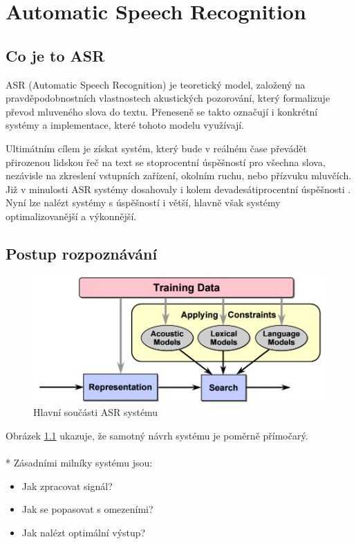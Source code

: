 \chapter{Automatic Speech Recognition}

\section{Co je to ASR}

ASR (Automatic Speech Recognition) je teoretický model, založený na pravděpodobnostních vlastnostech akustických pozorování, který formalizuje převod mluveného slova do textu. Přeneseně se takto označují i konkrétní systémy a implementace, které tohoto modelu využívají. 

Ultimátním cílem  je získat systém, který bude v reálném čase převádět přirozenou lidskou řeč na text se stoprocentní úspěšností pro všechna slova, nezávisle na zkreslení vstupních zařízení, okolním ruchu, nebo přízvuku mluvčích. Již v minulosti ASR systémy dosahovaly i kolem devadesátiprocentní úspěšnosti \cite{jelinek_1976}. Nyní lze nalézt systémy s úspěšností i větší, hlavně však systémy optimalizovanější a výkonnější.

\section{Postup rozpoznávání}

\begin{figure}[h]
	\centering
	\includegraphics[width=140mm]{img/asr_process.png}
	\caption{Hlavní součásti ASR systému \cite{mit_asr_2003}}
	\label{fig:asr_process}
\end{figure}

Obrázek \ref{fig:asr_process} ukazuje, že samotný návrh systému je poměrně přímočarý.
\\\\*
Zásadními milníky systému jsou:

\begin{itemize}
\item Jak zpracovat signál?
\item Jak se popasovat s omezeními?
\item Jak nalézt optimální výstup?
\end{itemize}

